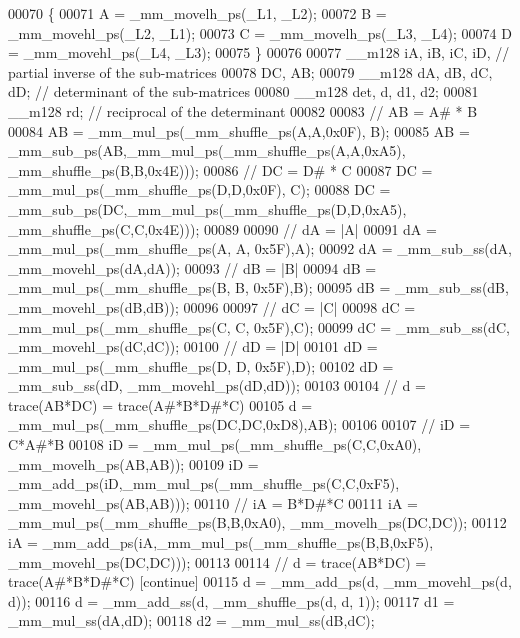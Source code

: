 \begin{DoxyCode}
00070     \{
00071       A = \_mm\_movelh\_ps(\_L1, \_L2);
00072       B = \_mm\_movehl\_ps(\_L2, \_L1);
00073       C = \_mm\_movelh\_ps(\_L3, \_L4);
00074       D = \_mm\_movehl\_ps(\_L4, \_L3);
00075     \}
00076 
00077     \_\_m128 iA, iB, iC, iD,                 \textcolor{comment}{// partial inverse of the sub-matrices}
00078             DC, AB;
00079     \_\_m128 dA, dB, dC, dD;                 \textcolor{comment}{// determinant of the sub-matrices}
00080     \_\_m128 det, d, d1, d2;
00081     \_\_m128 rd;                             \textcolor{comment}{// reciprocal of the determinant}
00082 
00083     \textcolor{comment}{//  AB = A# * B}
00084     AB = \_mm\_mul\_ps(\_mm\_shuffle\_ps(A,A,0x0F), B);
00085     AB = \_mm\_sub\_ps(AB,\_mm\_mul\_ps(\_mm\_shuffle\_ps(A,A,0xA5), \_mm\_shuffle\_ps(B,B,0x4E)));
00086     \textcolor{comment}{//  DC = D# * C}
00087     DC = \_mm\_mul\_ps(\_mm\_shuffle\_ps(D,D,0x0F), C);
00088     DC = \_mm\_sub\_ps(DC,\_mm\_mul\_ps(\_mm\_shuffle\_ps(D,D,0xA5), \_mm\_shuffle\_ps(C,C,0x4E)));
00089 
00090     \textcolor{comment}{//  dA = |A|}
00091     dA = \_mm\_mul\_ps(\_mm\_shuffle\_ps(A, A, 0x5F),A);
00092     dA = \_mm\_sub\_ss(dA, \_mm\_movehl\_ps(dA,dA));
00093     \textcolor{comment}{//  dB = |B|}
00094     dB = \_mm\_mul\_ps(\_mm\_shuffle\_ps(B, B, 0x5F),B);
00095     dB = \_mm\_sub\_ss(dB, \_mm\_movehl\_ps(dB,dB));
00096 
00097     \textcolor{comment}{//  dC = |C|}
00098     dC = \_mm\_mul\_ps(\_mm\_shuffle\_ps(C, C, 0x5F),C);
00099     dC = \_mm\_sub\_ss(dC, \_mm\_movehl\_ps(dC,dC));
00100     \textcolor{comment}{//  dD = |D|}
00101     dD = \_mm\_mul\_ps(\_mm\_shuffle\_ps(D, D, 0x5F),D);
00102     dD = \_mm\_sub\_ss(dD, \_mm\_movehl\_ps(dD,dD));
00103 
00104     \textcolor{comment}{//  d = trace(AB*DC) = trace(A#*B*D#*C)}
00105     d = \_mm\_mul\_ps(\_mm\_shuffle\_ps(DC,DC,0xD8),AB);
00106 
00107     \textcolor{comment}{//  iD = C*A#*B}
00108     iD = \_mm\_mul\_ps(\_mm\_shuffle\_ps(C,C,0xA0), \_mm\_movelh\_ps(AB,AB));
00109     iD = \_mm\_add\_ps(iD,\_mm\_mul\_ps(\_mm\_shuffle\_ps(C,C,0xF5), \_mm\_movehl\_ps(AB,AB)));
00110     \textcolor{comment}{//  iA = B*D#*C}
00111     iA = \_mm\_mul\_ps(\_mm\_shuffle\_ps(B,B,0xA0), \_mm\_movelh\_ps(DC,DC));
00112     iA = \_mm\_add\_ps(iA,\_mm\_mul\_ps(\_mm\_shuffle\_ps(B,B,0xF5), \_mm\_movehl\_ps(DC,DC)));
00113 
00114     \textcolor{comment}{//  d = trace(AB*DC) = trace(A#*B*D#*C) [continue]}
00115     d  = \_mm\_add\_ps(d, \_mm\_movehl\_ps(d, d));
00116     d  = \_mm\_add\_ss(d, \_mm\_shuffle\_ps(d, d, 1));
00117     d1 = \_mm\_mul\_ss(dA,dD);
00118     d2 = \_mm\_mul\_ss(dB,dC);

\end{DoxyCode}
